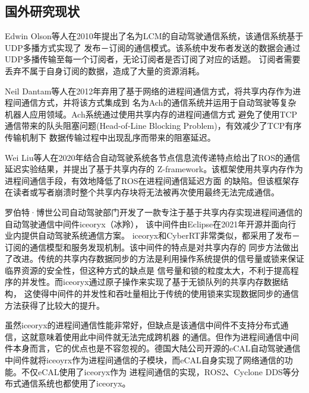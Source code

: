 \subsection{国外研究现状}
Edwin Olson等人在2010年提出了名为LCM\cite{2010LCM}的自动驾驶通信系统，该通信系统基于UDP多播方式实现了
发布－订阅的通信模式。该系统中发布者发送的数据会通过UDP多播传输至每一个订阅者，无论订阅者是否订阅了对应的话题。
订阅者需要丢弃不属于自身订阅的数据，造成了大量的资源消耗。

Neil Dantam等人在2012年弃用了基于网络的进程间通信方式，将共享内存作为进程间通信方式，并将该方式集成到
名为Ach\cite{6651538}的通信系统并运用于自动驾驶等复杂机器人应用领域。Ach系统通过使用共享内存的进程间通信方式
避免了使用TCP通信带来的队头阻塞问题(Head-of-Line Blocking Problem)，有效减少了TCP有序传输机制下
数据传输过程中出现乱序而带来的阻塞延迟\cite{8863328}。

Wei Liu等人在2020年结合自动驾驶系统各节点信息流传递特点给出了ROS的通信延迟实验结果，并提出了基于共享内存的
Z-framework\cite{2020memory}。该框架使用共享内存作为进程间通信手段，有效地降低了ROS在进程间通信延迟方面
的缺陷。但该框架存在读者或写者崩溃时整个共享内存块将无法被再次使用最终无法完成通信。


罗伯特·博世公司自动驾驶部门开发了一款专注于基于共享内存实现进程间通信的自动驾驶通信中间件iceoryx（冰羚），
该中间件由Eclipse在2021年开源并面向行业内提供自动驾驶系统通信方案。
iceoryx和CyberRT非常类似，都采用了发布－订阅的通信模型和服务发现机制。该中间件的特点是对共享内存的
同步方法做出了改进。传统的共享内存数据同步的方法是利用操作系统提供的信号量或锁来保证临界资源的安全性，但这种方式的缺点是
信号量和锁的粒度太大，不利于提高程序的并发性。而iceoryx通过原子操作来实现了基于无锁队列的共享内存数据结构，
这使得中间件的并发性和吞吐量相比于传统的使用锁来实现数据同步的通信方法获得了比较大的提升\cite{iceoryx}。

虽然iceoryx的进程间通信性能非常好，但缺点是该通信中间件不支持分布式通信，这就意味着使用此中间件就无法完成跨机器
的通信。但作为进程间通信中间件本身而言，它的优点也是不容忽视的。德国大陆公司开源的eCAL自动驾驶通信
中间件就将iceoyrx作为进程间通信的子模块，而eCAL自身实现了网络通信的功能。不仅eCAL使用了iceoryx作为
进程间通信的实现，ROS2、Cyclone DDS等分布式通信系统也都使用了iceoryx\cite{ecal}。


